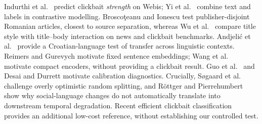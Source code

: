 \documentclass[11pt]{article}
\begin{document}
Indurthi et al.\ \cite{indurthi2020} predict clickbait \emph{strength} on Webis; Yi et al.\ \cite{yi2022} combine text and labels in contrastive modelling. Brosco\c{t}eanu and Ionescu \cite{roclico2023} test publisher-disjoint Romanian articles, closest to source separation, whereas Wu et al.\ \cite{wu2020} compare title style with title--body interaction on news and clickbait benchmarks. Andjeli\'c et al.\ \cite{andelic2025} provide a Croatian-language test of transfer across linguistic contexts. Reimers and Gurevych \cite{reimers2019sbert} motivate fixed sentence embeddings; Wang et al.\ \cite{wang2020minilm} motivate compact encoders, without providing a clickbait result. Guo et al.\ \cite{guo2017calibration} and Desai and Durrett \cite{desai2020} motivate calibration diagnostics. Crucially, S\o gaard et al.\ \cite{sogaard2021} challenge overly optimistic random splitting, and R\"ottger and Pierrehumbert \cite{rottger2021} show why social-language changes do not automatically translate into downstream temporal degradation. Recent efficient clickbait classification \cite{kuntur2026} provides an additional low-cost reference, without establishing our controlled test.
\end{document}
